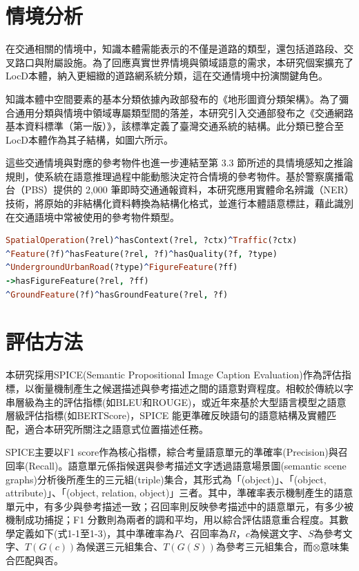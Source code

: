 \section{情境分析}

在交通相關的情境中，知識本體需能表示的不僅是道路的類型，還包括道路段、交叉路口與附屬設施。為了回應真實世界情境與領域語意的需求，本研究個案擴充了LocD本體，納入更細緻的道路網系統分類，這在交通情境中扮演關鍵角色。

知識本體中空間要素的基本分類依據內政部發布的《地形圖資分類架構》。為了彌合通用分類與情境中領域專屬類型間的落差，本研究引入交通部發布之《交通網路基本資料標準（第一版）》，該標準定義了臺灣交通系統的結構。此分類已整合至LocD本體作為其子結構，如圖六所示。

這些交通情境與對應的參考物件也進一步連結至第 3.3 節所述的具情境感知之推論規則，使系統在語意推理過程中能動態決定符合情境的參考物件。基於警察廣播電台（PBS）提供的 2,000 筆即時交通通報資料，本研究應用實體命名辨識（NER）技術，將原始的非結構化資料轉換為結構化格式，並進行本體語意標註，藉此識別在交通語境中常被使用的參考物件類型。

\begin{lstlisting}[language=Prolog, basicstyle=\ttfamily, xleftmargin=2em]
SpatialOperation(?rel)^hasContext(?rel, ?ctx)^Traffic(?ctx)
^Feature(?f)^hasFeature(?rel, ?f)^hasQuality(?f, ?type)
^UndergroundUrbanRoad(?type)^FigureFeature(?ff) 
->hasFigureFeature(?rel, ?ff)
^GroundFeature(?f)^hasGroundFeature(?rel, ?f)
\end{lstlisting}


\section{評估方法}
本研究採用SPICE(Semantic Propositional Image Caption Evaluation)作為評估指標\citep{RN29}，以衡量機制產生之候選描述與參考描述之間的語意對齊程度。相較於傳統以字串層級為主的評估指標(如BLEU和ROUGE)，或近年來基於大型語言模型之語意層級評估指標(如BERTScore)，SPICE 能更準確反映語句的語意結構及實體匹配，適合本研究所關注之語意式位置描述任務。

SPICE主要以F1 score作為核心指標，綜合考量語意單元的準確率(Precision)與召回率(Recall)。語意單元係指候選與參考描述文字透過語意場景圖(semantic scene graphs)分析後所產生的三元組(triple)集合，其形式為「(object)」、「(object, attribute)」、「(object, relation, object)」三者。其中，準確率表示機制產生的語意單元中，有多少與參考描述一致；召回率則反映參考描述中的語意單元，有多少被機制成功捕捉；F1 分數則為兩者的調和平均，用以綜合評估語意重合程度。其數學定義如下(式1-1至1-3)，其中準確率為$P$、召回率為$R$，$c$為候選文字、$S$為參考文字、$T(G(c))$為候選三元組集合、$T(G(S))$為參考三元組集合，而$\otimes$意味集合匹配與否。

